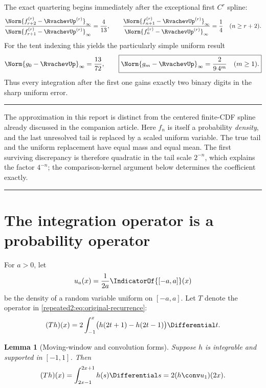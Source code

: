 \documentclass[11pt,oneside]{article}
\newtheorem{lemma}[lemma]{Lemma}
\theoremstyle{definition}
\theoremstyle{remark}
\newenvironment{boxedremark}{%
  \par\smallskip\noindent\begin{center}\begin{minipage}{0.94\textwidth}%
  \color{black}\hrule\vspace{0.6em}\small
}{%
  \vspace{0.6em}\hrule\end{minipage}\end{center}\smallskip
}
\begin{document}
The exact quartering begins immediately after the exceptional first $C^r$ spline:
\begin{equation}
 \frac{\Norm{f_{r+2}^{(r)}-\RvachevUp^{(r)}}_\infty}
 {\Norm{f_{r+1}^{(r)}-\RvachevUp^{(r)}}_\infty}=\frac4{13},
 \qquad
 \frac{\Norm{f_{n+1}^{(r)}-\RvachevUp^{(r)}}_\infty}
 {\Norm{f_n^{(r)}-\RvachevUp^{(r)}}_\infty}=\frac14
 \quad(n\ge r+2).
 \label{repeated2:eq:exact-error-ratios}
\end{equation}
For the tent indexing this yields the particularly simple uniform result
\begin{equation}
 \Norm{g_0-\RvachevUp}_\infty=\frac{13}{72},
 \qquad
 \boxed{\displaystyle
 \Norm{g_m-\RvachevUp}_\infty=\frac{2}{9\,4^m}\quad(m\ge1).}
 \label{repeated2:eq:tent-uniform-rate}
\end{equation}
Thus every integration after the first one gains exactly two binary digits in the sharp
uniform error.

\begin{boxedremark}
The approximation in this report is distinct from the centered finite-CDF spline already
discussed in the companion article.  Here $f_n$ is itself a probability \emph{density}, and
the last unresolved tail is replaced by a scaled uniform variable.  The true tail and the
uniform replacement have equal mass and equal mean.  The first surviving discrepancy is
therefore quadratic in the tail scale $2^{-n}$, which explains the factor $4^{-n}$; the
comparison-kernel argument below determines the coefficient exactly.
\end{boxedremark}

\section{The integration operator is a probability operator}
\label{repeated2:sec:probability-operator}

For $a>0$, let
\begin{equation}
 u_a(x)=\frac1{2a}\IndicatorOf{[-a,a]}(x)
 \label{repeated2:eq:uniform-density}
\end{equation}
be the density of a random variable uniform on $[-a,a]$.  Let $T$ denote the operator in
\eqref{repeated2:eq:original-recurrence}:
\begin{equation}
 (Th)(x)=2\int_{-1}^{x}\bigl(h(2t+1)-h(2t-1)\bigr)\Differential t.
 \label{repeated2:eq:T-definition}
\end{equation}

\begin{lemma}[Moving-window and convolution forms]
\label{repeated2:lem:T-convolution}
Suppose $h$ is integrable and supported in $[-1,1]$.  Then
\begin{equation}
 (Th)(x)=\int_{2x-1}^{2x+1}h(s)\Differential s
 =2(h\conv u_1)(2x).
 \label{repeated2:eq:T-moving-window}
\end{equation}
\end{lemma}
\end{document}
